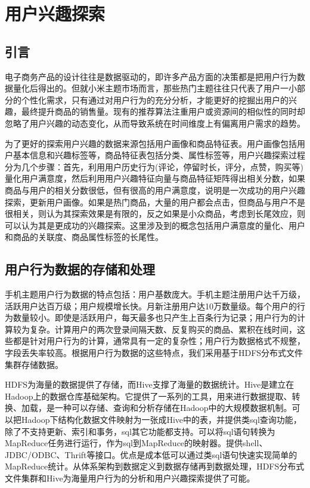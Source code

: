
\chapter{用户兴趣探索}
\section{引言}
\label{chap:interestExplore}
电子商务产品的设计往往是数据驱动的，即许多产品方面的决策都是把用户行为数据量化后得出的。但就小米主题市场而言，那些热门主题往往只代表了用户一小部分的个性化需求，只有通过对用户行为的充分分析，才能更好的挖掘出用户的兴趣，最终提升商品的销售量。现有的推荐算法注重用户或资源间的相似性的同时却忽略了用户兴趣的动态变化，从而导致系统在时间维度上有偏离用户需求的趋势。

为了更好的探索用户兴趣的数据来源包括用户画像和商品特征表。用户画像包括用户基本信息和兴趣标签等，商品特征表包括分类、属性标签等，用户兴趣探索过程分为几个步骤：首先，利用用户历史行为(评论，停留时长，评分，点赞，购买等)量化用户满意度，然后利用用户兴趣特征向量与商品特征矩阵得出相关分数，如果商品与用户的相关分数很低，但有很高的用户满意度，说明是一次成功的用户兴趣探索，更新用户画像。如果是热门商品，大量的用户都会点击，但商品与用户不是很相关，则认为其探索效果是有限的，反之如果是小众商品，考虑到长尾效应，则可以认为其是更成功的兴趣探索。这里涉及到的概念包括用户满意度的量化、用户和商品的关联度、商品属性标签的长尾性。

\section{用户行为数据的存储和处理}
手机主题用户行为数据的特点包括：用户基数庞大。手机主题注册用户达千万级，活跃用户达百万级；用户规模增长快。月新注册用户达10万数量级。每个用户的行为数量较小。即使是活跃用户，每天最多也只产生上百条行为记录；用户行为的计算较为复杂。计算用户的两次登录间隔天数、反复购买的商品、累积在线时间，这些都是针对用户行为的计算，通常具有一定的复杂性；用户行为数据格式不规整，字段丢失率较高。根据用户行为数据的这些特点，我们采用基于HDFS分布式文件集群存储数据。

HDFS为海量的数据提供了存储，而Hive支撑了海量的数据统计。Hive是建立在Hadoop上的数据仓库基础架构。它提供了一系列的工具，用来进行数据提取、转换、加载，是一种可以存储、查询和分析存储在Hadoop中的大规模数据机制。可以把Hadoop下结构化数据文件映射为一张成Hive中的表，并提供类sql查询功能，除了不支持更新、索引和事务，sql其它功能都支持。可以将sql语句转换为MapReduce任务进行运行，作为sql到MapReduce的映射器。提供shell、JDBC/ODBC、Thrift等接口。优点是成本低可以通过类sql语句快速实现简单的MapReduce统计。从体系架构到数据定义到数据存储再到数据处理，HDFS分布式文件集群和Hive为海量用户行为的分析和用户兴趣探索提供了可能。
